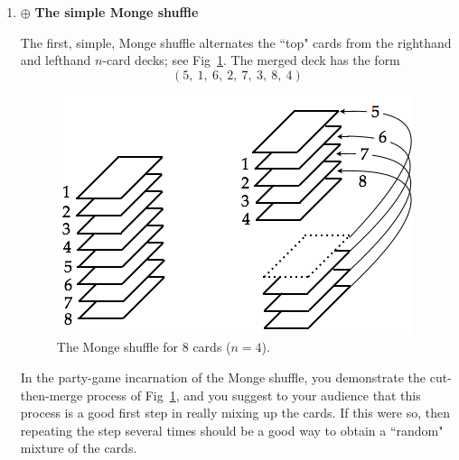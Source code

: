 \begin{itemize}
  \begin{enumerate}
  \item $\oplus$ {\bf The simple Monge shuffle}

\smallskip

The first, simple, Monge shuffle alternates the ``top" cards from the righthand and lefthand $n$-card decks; see Fig~\ref{fig:suffleMonge}.  The merged deck has the form
\[ (5, \ 1, \ 6, \ 2, \ 7, \ 3, \ 8, \ 4) \]
\begin{figure}[h]
\begin{center}
        \includegraphics[scale=0.4]{FiguresArithmetic/suffleMongeBasic}
        \caption{The Monge shuffle for $8$ cards ($n=4$).}
        \label{fig:suffleMonge}
\end{center}
\end{figure}

In the party-game incarnation of the Monge shuffle, you demonstrate the cut-then-merge process of Fig~\ref{fig:suffleMonge}, and you suggest to your audience that this process is a good first step in really mixing up the cards.  If this were so, then repeating the step several times should be a good way to obtain a ``random" mixture of the cards.

\smallskip


\end{enumerate}
\end{itemize}
